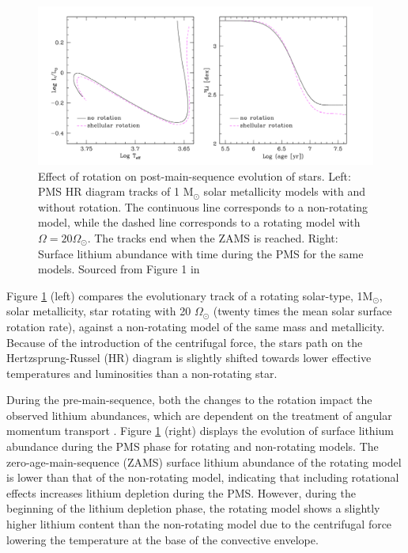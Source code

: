 \begin{figure}[h]
    \includegraphics[width=\textwidth]{Figures/intro_figures/PMS_effect.png}
    \caption[Effect of rotation on pre-main-sequence evolution of a 1 $M_{\odot}$ star.]{Effect of rotation on post-main-sequence evolution of stars. Left: PMS HR diagram tracks of 1 M$_{\odot}$ solar metallicity models with and without rotation. The continuous line corresponds to a non-rotating model, while the dashed line corresponds to a rotating model with $\Omega = 20 \Omega_{\odot}$. The tracks end when the ZAMS is reached. Right: Surface lithium abundance with time during the PMS for the same models. Sourced from Figure 1 in \citet{eggenberger_rotation_2013}}
    \label{fig:pms_effect}
\end{figure}

Figure \ref{fig:pms_effect} (left) compares the evolutionary track of a rotating solar-type, 1M$_{\odot}$, solar metallicity, star rotating with 20 $\Omega_{\odot}$ (twenty times the mean solar surface rotation rate), against a non-rotating model of the same mass and metallicity. 
Because of the introduction of the centrifugal force, the stars path on the Hertzsprung-Russel (HR) diagram is slightly shifted towards lower effective temperatures and luminosities than a non-rotating star.

During the pre-main-sequence, both the changes to the rotation impact the observed lithium abundances, which are dependent on the treatment of angular momentum transport \citep{dumont_lithium_2021}.
Figure \ref{fig:pms_effect} (right) displays the evolution of surface lithium abundance during the PMS phase for rotating and non-rotating models. 
The zero-age-main-sequence (ZAMS) surface lithium abundance of the rotating model is lower than that of the non-rotating model, indicating that including rotational effects increases lithium depletion during the PMS. 
However, during the beginning of the lithium depletion phase, the rotating model shows a slightly higher lithium content than the non-rotating model due to the centrifugal force lowering the temperature at the base of the convective envelope.

